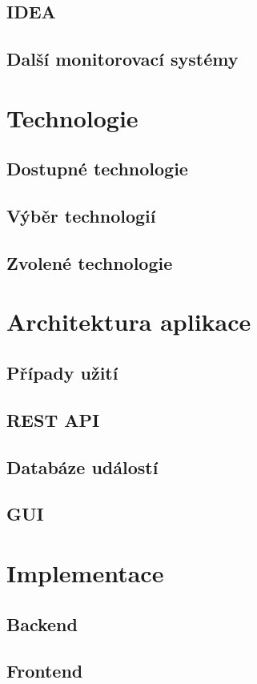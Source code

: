 \section{IDEA}
\label{sec:idea}

\section{Další monitorovací systémy}

\chapter{Technologie}
\section{Dostupné technologie}
\section{Výběr technologií}
\section{Zvolené technologie}

\chapter{Architektura aplikace}
\section{Případy užití}
\section{REST API}
\section{Databáze událostí}
\section{GUI}

\chapter{Implementace}
\section{Backend}
\section{Frontend}
